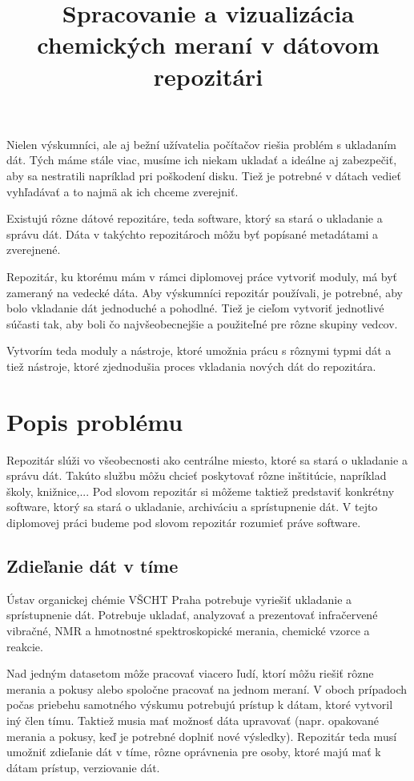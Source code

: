 \documentclass[thesis=M,slovak]{FITthesis}[2013/05/06]
\title{Spracovanie a vizualizácia chemických meraní v dátovom repozitári}
\begin{document}

\begin{introduction}
Nielen výskumníci, ale aj bežní užívatelia počítačov riešia problém s ukladaním dát. Tých máme stále viac, musíme ich niekam ukladať a ideálne aj zabezpečiť, aby sa nestratili napríklad pri poškodení disku. Tiež je potrebné v dátach vedieť vyhľadávať a to najmä ak ich chceme zverejniť. 

Existujú rôzne dátové repozitáre, teda software, ktorý sa stará o ukladanie a správu dát. Dáta v takýchto repozitároch môžu byť popísané metadátami a zverejnené.

Repozitár, ku ktorému mám v rámci diplomovej práce vytvoriť moduly, má byť zameraný na vedecké dáta. Aby výskumníci repozitár používali, je potrebné, aby bolo vkladanie dát jednoduché a pohodlné. Tiež je cieľom vytvoriť jednotlivé súčasti tak, aby boli čo najvšeobecnejšie a použiteľné pre rôzne skupiny vedcov.

Vytvorím teda moduly a nástroje, ktoré umožnia prácu s rôznymi typmi dát a tiež nástroje, ktoré zjednodušia proces vkladania nových dát do repozitára.
\end{introduction}

\chapter{Popis problému}
Repozitár slúži vo všeobecnosti ako centrálne miesto, ktoré sa stará o ukladanie a správu dát. Takúto službu môžu chcieť poskytovať rôzne inštitúcie, napríklad školy, knižnice,... Pod slovom repozitár si môžeme taktiež predstaviť konkrétny software, ktorý sa stará o ukladanie, archiváciu a sprístupnenie dát. V tejto diplomovej práci budeme pod slovom repozitár rozumieť práve software.

\section{Zdieľanie dát v tíme}
Ústav organickej chémie VŠCHT Praha potrebuje vyriešiť ukladanie a sprístupnenie dát. Potrebuje ukladať, analyzovať a prezentovať infračervené vibračné, NMR a hmotnostné spektroskopické merania, chemické vzorce a reakcie.

Nad jedným datasetom môže pracovať viacero ľudí, ktorí môžu riešiť rôzne merania a pokusy alebo spoločne pracovať na jednom meraní. V oboch prípadoch počas priebehu samotného výskumu potrebujú prístup k dátam, ktoré vytvoril iný člen tímu. Taktiež musia mať možnosť dáta upravovať (napr. opakované merania a pokusy, keď je potrebné doplniť nové výsledky). Repozitár teda musí umožniť zdieľanie dát v tíme, rôzne oprávnenia pre osoby, ktoré majú mať k dátam prístup, verziovanie dát.
\end{document}

